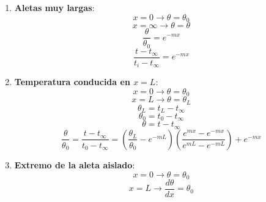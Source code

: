 \begin{enumerate}
    \item \textbf{Aletas muy largas}:
        \begin{equation*}
            x = 0 \rightarrow \theta = \theta_0
        \end{equation*}
        \begin{equation*}
            x = \infty \rightarrow \theta = \theta
        \end{equation*}
        \begin{equation*}
            \frac{\theta}{\theta_0} = e^{-mx}
        \end{equation*}
        \begin{equation}
            \frac{t - t_{\infty}}{t_i - t_{\infty}} = e^{-mx}
        \end{equation}
    \item \textbf{Temperatura conducida en $x = L$}:
        \begin{equation*}
            x = 0 \rightarrow \theta = \theta_0
        \end{equation*}
        \begin{equation*}
            x = L \rightarrow \theta = \theta_L
        \end{equation*}
        \begin{equation*}
            \theta_L = t_L - t_{\infty}
        \end{equation*}
        \begin{equation*}
            \theta_0 = t_0 - t_{\infty}
        \end{equation*}
        \begin{equation*}
            \theta = t - t_{\infty}
        \end{equation*}
        \begin{equation}
            \frac{\theta}{\theta_0} = \frac{t - t_{\infty}}{t_0 - t_{\infty}} = \left(\frac{\theta_L}{\theta_0} - e^{-mL}\right)\left(\frac{e^{mx} - e^{-mx}}{e^{mL} - e^{-mL}}\right) + e^{-mx}
        \end{equation}
    \item \textbf{Extremo de la aleta aislado}:
        \begin{equation*}
            x = 0 \rightarrow \theta = \theta_0
        \end{equation*}
        \begin{equation*}
            x = L \rightarrow \frac{d\theta}{dx} = \theta_0
        \end{equation*}
        \begin{equation}

\end{equation}
\end{enumerate}
